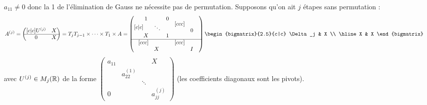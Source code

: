 \begin{preuve}
    $a_{11} \ne 0$ donc la 1 de l'élimination de Gauss ne nécessite pas de permutation.
    Supposons qu'on ait $j$ étapes sans permutation :
    \[
        A^{(j)} =
        \begin{pmatrix}[c|c]
            U^{(j)} & X \\ \hline
            0 & X
        \end{pmatrix}
        = T_j T_{j-1} \times \dots \times T_1 \times A =
        \begin{pmatrix}[c|c]
            \begin{matrix}
                1 & & 0 \\
                & \ddots & \\
                X & & 1
            \end{matrix}
            & \begin{matrix}[ccc]\\ & 0 & \\ \end{matrix}
            \\ \hline
            \begin{matrix}[ccc]\\ & X & \\ \end{matrix}
            & \begin{matrix}[ccc]\\ & I & \\ \end{matrix}
        \end{pmatrix}
        \begin{bigmatrix}{2.5}{c|c}
            \Delta_j & X \\
            \hline
            X & X
        \end{bigmatrix}
    \]
    avec $U^{(j)} \in M_j(\mathbb{R})$ de la forme 
    $\begin{pmatrix} 
        a_{11} & & & X \\
        & a_{22}^{(1)} & & \\
        & & \ddots & \\
        0 & & & a_{jj}^{(j)}
    \end{pmatrix}$
    (les coefficients diagonaux sont les pivots).


\end{preuve}
